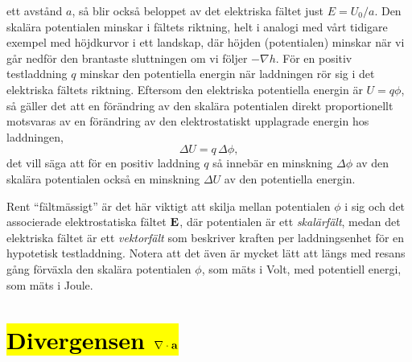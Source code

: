 ett avst{\aa}nd $a$, s{\aa} blir ocks{\aa} beloppet av det elektriska
f{\"a}ltet just $E=U_0/a$.
Den skal{\"a}ra potentialen minskar i f{\"a}ltets riktning, helt i analogi med
v{\aa}rt tidigare exempel med h{\"o}jdkurvor i ett landskap, d{\"a}r h{\"o}jden
(potentialen) minskar n{\"a}r vi g{\aa}r nedf{\"o}r den brantaste sluttningen
om vi f{\"o}ljer $-\nabla h$.
\noindent
F{\"o}r en positiv testladdning $q$ minskar den potentiella energin n{\"a}r
laddningen r{\"o}r sig i det elektriska f{\"a}ltets riktning. Eftersom den
elektriska potentiella energin {\"a}r $U=q\phi$, s{\aa} g{\"a}ller det att
en f{\"o}r{\"a}ndring av den skal{\"a}ra potentialen direkt proportionellt
motsvaras av en f{\"o}r{\"a}ndring av den elektrostatiskt upplagrade energin
hos laddningen,
$$
  \Delta U=q\,\Delta \phi,
$$
det vill s{\"a}ga att f{\"o}r en positiv laddning $q$ s{\aa} inneb{\"a}r en
minskning $\Delta\phi$ av den skal{\"a}ra potentialen ocks{\aa} en minskning
$\Delta U$ av den potentiella energin.

Rent ``f{\"a}ltm{\"a}ssigt'' {\"a}r det h{\"a}r viktigt att skilja mellan
potentialen $\phi$ i sig och det associerade elektrostatiska f{\"a}ltet
${\bf E}$, d{\"a}r potentialen {\"a}r ett {\it skal{\"a}rf{\"a}lt}, medan
det elektriska f{\"a}ltet {\"a}r ett {\it vektorf{\"a}lt} som beskriver
kraften per laddningsenhet f{\"o}r en hypotetisk testladdning.
Notera att det {\"a}ven {\"a}r mycket l{\"a}tt att l{\"a}ngs med resans
g{\aa}ng f{\"o}rv{\"a}xla den skal{\"a}ra potentialen $\phi$, som m{\"a}ts
i Volt, med potentiell energi, som m{\"a}ts i Joule.

\section{{\hl{Divergensen $\nabla\cdot{\bf a}$}}}
